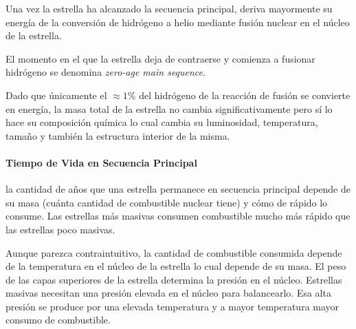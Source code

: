\documentclass{tufte-handout}
\begin{document}

Una vez la estrella ha alcanzado la secuencia principal, deriva mayormente su energía de la conversión de hidrógeno a helio mediante fusión nuclear en el núcleo de la estrella.

El momento en el que la estrella deja de contraerse y comienza a fusionar hidrógeno se denomina \emph{zero-age main sequence}.


Dado que únicamente el $\approx 1\%$ del hidrógeno de la reacción de fusión se convierte en energía, la masa total de la estrella no cambia significativamente pero sí lo hace su composición química lo cual cambia su luminosidad, temperatura, tamaño y también la estructura interior de la misma.


\paragraph{Tiempo de Vida en Secuencia Principal} la cantidad de años que una estrella permanece en secuencia principal depende de su masa (cuánta cantidad de combustible nuclear tiene) y cómo de rápido lo consume. Las estrellas más masivas consumen combustible mucho más rápido que las estrellas poco masivas.


Aunque parezca contraintuitivo, la cantidad de combustible consumida depende de la temperatura en el núcleo de la estrella lo cual depende de su masa. El peso de las capas superiores de la estrella determina la presión en el núcleo. Estrellas masivas necesitan una presión elevada en el núcleo para balancearlo. Esa alta presión se produce por una elevada temperatura y a mayor temperatura mayor consumo de combustible.
\end{document}
